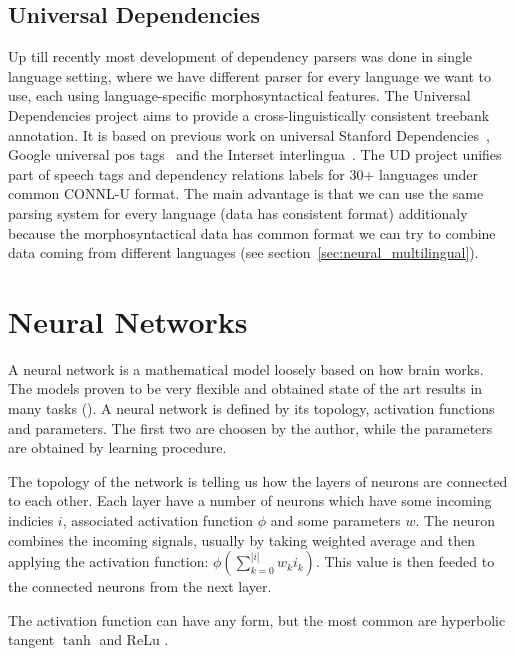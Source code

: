 \subsection{Universal Dependencies}
Up till recently most development of dependency parsers was done in single language
setting, where we have different parser for every language we want to use, each
using language-specific morphosyntactical features. The Universal Dependencies
project \cite{nivre_universal_2015} aims to provide a cross-linguistically consistent
treebank annotation. It is based on previous work on universal Stanford
Dependencies~\cite{marneffe_generating_2006},
Google universal pos tags~\cite{petrov_universal_2011}
and the Interset interlingua~\cite{zeman_reusable_2008}.
The UD project unifies part of speech tags and dependency relations labels
for 30+ languages under common CONNL-U format.
The main advantage is that we can use the same parsing system for every language
(data has consistent format) additionaly because the morphosyntactical data has
common format we can try to combine data coming from different languages (see
section~\ref{sec:neural_multilingual}).

\section{Neural Networks}
A neural network is a mathematical model loosely based on how brain works.
The models proven to be very flexible and obtained state of the art results in
many tasks (). A neural network is defined by its topology,
activation functions and parameters. The first two are choosen by the author,
while the parameters are obtained by learning procedure.

The topology of the network is telling us how the layers of neurons are connected
to each other. Each layer have a number of neurons which have some incoming
indicies $i$, associated activation function $\phi$ and some parameters $w$.
The neuron combines the incoming signals, usually by taking weighted average
and then applying the activation function: $ \phi ( \sum_{k=0}^{|i|} w_ki_k ) $.
This value is then feeded to the connected neurons from the next layer.

The activation function can have any form, but the most common are hyperbolic tangent
$\tanh$ and ReLu \cite{nair_rectified_2010}.

